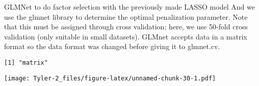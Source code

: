 \documentclass[12pt,]{article}
\newenvironment{Shaded}{\begin{snugshade}}{\end{snugshade}}
\newcommand{\CommentTok}[1]{\textcolor[rgb]{0.56,0.35,0.01}{\textit{#1}}}
\newcommand{\DataTypeTok}[1]{\textcolor[rgb]{0.13,0.29,0.53}{#1}}
\newcommand{\DecValTok}[1]{\textcolor[rgb]{0.00,0.00,0.81}{#1}}
\newcommand{\KeywordTok}[1]{\textcolor[rgb]{0.13,0.29,0.53}{\textbf{#1}}}
\newcommand{\NormalTok}[1]{#1}
\newcommand{\OperatorTok}[1]{\textcolor[rgb]{0.81,0.36,0.00}{\textbf{#1}}}
\newcommand{\StringTok}[1]{\textcolor[rgb]{0.31,0.60,0.02}{#1}}
\begin{document}
GLMNet to do factor selection with the previously made LASSO model And
we use the glmnet library to determine the optimal penalization
parameter. Note that this must be assigned through cross validation;
here, we use 50-fold cross validation (only suitable in small datasets).
GLMnet accepts data in a matrix format so the data format was changed
before giving it to glmnet.cv.

\begin{Shaded}
\end{Shaded}

\begin{verbatim}
[1] "matrix"
\end{verbatim}

\begin{Shaded}
\end{Shaded}

\texttt{[image: Tyler-2\_files/figure-latex/unnamed-chunk-30-1.pdf]}
\end{document}
